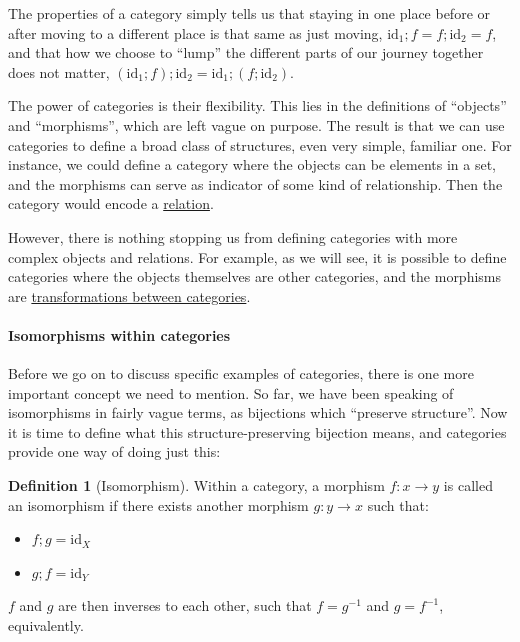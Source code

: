 \documentclass[
  openany]{book}
\providecommand{\tightlist}{%
  \setlength{\itemsep}{0pt}\setlength{\parskip}{0pt}}
\theoremstyle{definition}
\newtheorem{definition}{Definition}[chapter]
\theoremstyle{definition}
\theoremstyle{definition}
\theoremstyle{definition}
\theoremstyle{remark}
\begin{document}
The properties of a category simply tells us that staying in one place before or after moving to a different place is that same as just moving, \(\text{id}_1 ;f = f ;\text{id}_2 = f\), and that how we choose to ``lump'' the different parts of our journey together does not matter, \((\text{id}_1 ;f) ;\text{id}_2 = \text{id}_1 ;(f ;\text{id}_2)\).

The power of categories is their flexibility. This lies in the definitions of ``objects'' and ``morphisms'', which are left vague on purpose. The result is that we can use categories to define a broad class of structures, even very simple, familiar one. For instance, we could define a category where the objects can be elements in a set, and the morphisms can serve as indicator of some kind of relationship. Then the category would encode a \hyperref[relations]{relation}.

However, there is nothing stopping us from defining categories with more complex objects and relations. For example, as we will see, it is possible to define categories where the objects themselves are other categories, and the morphisms are \hyperref[functors]{transformations between categories}.

\paragraph{Isomorphisms within categories}\label{isomorphism}

Before we go on to discuss specific examples of categories, there is one more important concept we need to mention. So far, we have been speaking of isomorphisms in fairly vague terms, as bijections which ``preserve structure''. Now it is time to define what this structure-preserving bijection means, and categories provide one way of doing just this:

\begin{definition}[Isomorphism]
Within a category, a morphism \(f: x \to y\) is called an isomorphism if there exists another morphism \(g: y \to x\) such that:

\begin{itemize}
\tightlist
\item
  \(f ;g = \text{id}_X\)
\item
  \(g ;f = \text{id}_Y\)
\end{itemize}

\(f\) and \(g\) are then inverses to each other, such that \(f = g^{-1}\) and \(g = f^{-1}\), equivalently.
\end{definition}
\end{document}
